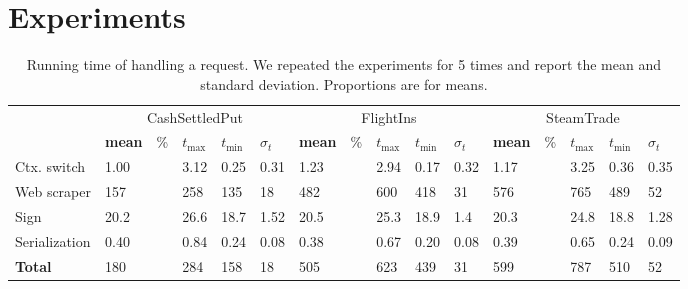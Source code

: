 \section{Experiments}
\label{sec:experiments}

\begin{table*}[h]
\begin{tabular}{l|lllll|lllll|lllll}
\toprule
& \multicolumn{5}{c|}{\sf CashSettledPut} &
  \multicolumn{5}{c|}{\sf FlightIns} &
  \multicolumn{5}{c}{\sf SteamTrade} \\
    & \textbf{mean} & \% & $t_{\max}$ & $t_{\min}$ & $\sigma_t$ & \textbf{mean}
    & \% & $t_{\max}$ & $t_{\min}$ & $\sigma_t$ & \textbf{mean} & \% & $t_{\max}$
    & $t_{\min}$ & $\sigma_t$\\
\midrule
    Ctx. switch & 1.00 &  & 3.12 & 0.25 & 0.31 & 1.23 &  & 2.94 & 0.17 &
    0.32 & 1.17 &  & 3.25 & 0.36 & 0.35\\
    Web scraper & 157 &  & 258 & 135 & 18 & 482 &  & 600 & 418 & 31 & 576 &  &
    765 & 489 & 52\\
    Sign & 20.2 &  & 26.6 & 18.7 & 1.52 & 20.5 &  & 25.3 & 18.9 & 1.4 & 20.3 &
    & 24.8 & 18.8 & 1.28\\
    Serialization & 0.40 &  & 0.84 & 0.24 & 0.08 & 0.38 &  & 0.67 & 0.20 &
    0.08 & 0.39 &  & 0.65 & 0.24 & 0.09\\
\midrule
\midrule
    \textbf{Total} & 180 &  & 284 & 158 & 18 & 505 &  & 623 & 439
    & 31 & 599 &  & 787 & 510 & 52 \\
\bottomrule	
\end{tabular}
\caption{Running time of handling a request. We repeated the experiments for 5 times and
report the mean and standard deviation. Proportions are for means.}
\label{tab:eval_profiling}
\end{table*}

